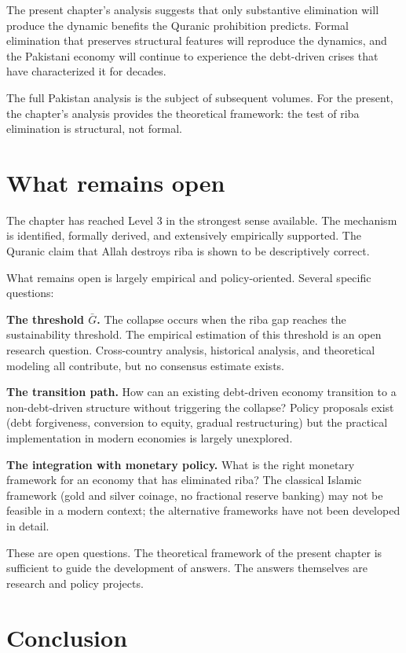 The present chapter's analysis suggests that only substantive
elimination will produce the dynamic benefits the Quranic
prohibition predicts. Formal elimination that preserves
structural features will reproduce the dynamics, and the
Pakistani economy will continue to experience the
debt-driven crises that have characterized it for decades.

The full Pakistan analysis is the subject of subsequent volumes.
For the present, the chapter's analysis provides the theoretical
framework: the test of riba elimination is structural, not
formal.

\section{What remains open}
\label{sec:riba-open}

The chapter has reached Level 3 in the strongest sense available.
The mechanism is identified, formally derived, and extensively
empirically supported. The Quranic claim that Allah destroys
riba is shown to be descriptively correct.

What remains open is largely empirical and policy-oriented. Several
specific questions:

\textbf{The threshold $\bar{G}$.} The collapse occurs when the
riba gap reaches the sustainability threshold. The empirical
estimation of this threshold is an open research question. Cross-country
analysis, historical analysis, and theoretical modeling all
contribute, but no consensus estimate exists.

\textbf{The transition path.} How can an existing
debt-driven economy transition to a non-debt-driven structure
without triggering the collapse? Policy proposals exist (debt
forgiveness, conversion to equity, gradual restructuring) but the
practical implementation in modern economies is largely
unexplored.

\textbf{The integration with monetary policy.} What is the right
monetary framework for an economy that has eliminated riba? The
classical Islamic framework (gold and silver coinage, no fractional
reserve banking) may not be feasible in a modern context; the
alternative frameworks have not been developed in detail.

These are open questions. The theoretical framework of the present
chapter is sufficient to guide the development of answers. The
answers themselves are research and policy projects.

\section{Conclusion}

